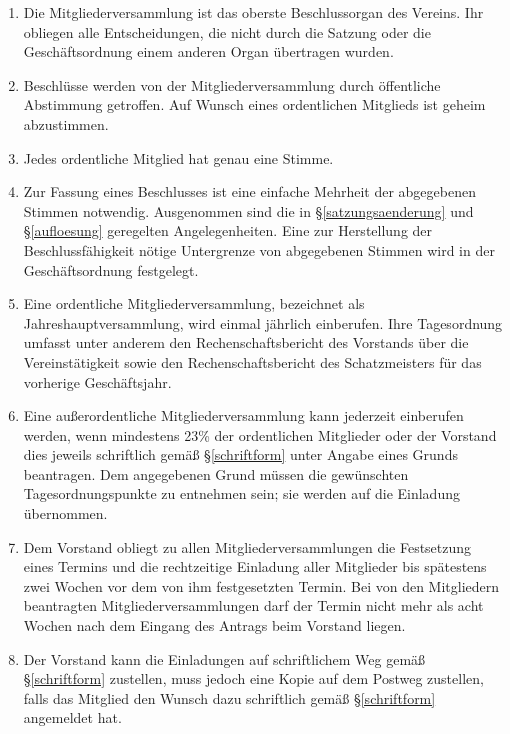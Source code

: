 \documentclass[fontsize=12pt,paper=a4,pagesize,headings=small]{scrartcl}
\begin{document}
\begin{enumerate}
	\item Die Mitgliederversammlung ist das oberste Beschlussorgan des
		Vereins. Ihr obliegen alle Entscheidungen, die nicht durch die
		Satzung oder die Geschäftsordnung einem anderen Organ übertragen
		wurden.

	\item Beschlüsse werden von der Mitgliederversammlung durch öffentliche
		Abstimmung getroffen. Auf Wunsch eines ordentlichen Mitglieds ist geheim
		abzustimmen.

	\item Jedes ordentliche Mitglied hat genau eine Stimme.

	\item Zur Fassung eines Beschlusses ist eine einfache Mehrheit der
		abgegebenen Stimmen notwendig. Ausgenommen sind die in
		§\ref{satzungsaenderung} und §\ref{aufloesung} geregelten
		Angelegenheiten. Eine zur Herstellung der
		Beschlussfähigkeit nötige Untergrenze von abgegebenen
		Stimmen wird in der Geschäftsordnung festgelegt.

	\item Eine ordentliche Mitgliederversammlung, bezeichnet als
		Jahreshauptversammlung, wird einmal jährlich einberufen. Ihre
		Tagesordnung umfasst unter anderem den Rechenschaftsbericht des
		Vorstands über die Vereinstätigkeit sowie den Rechenschaftsbericht des
		Schatzmeisters für das vorherige Geschäftsjahr.

	\item Eine außerordentliche Mitgliederversammlung kann jederzeit
		einberufen werden, wenn mindestens 23\% der ordentlichen Mitglieder
		oder der Vorstand dies jeweils schriftlich gemäß §\ref{schriftform} unter Angabe
		eines Grunds beantragen. Dem angegebenen Grund müssen die gewünschten
		Tagesordnungspunkte zu entnehmen sein; sie werden auf die Einladung
		übernommen.

	\item Dem Vorstand obliegt zu allen Mitgliederversammlungen die
		Festsetzung eines Termins und die rechtzeitige Einladung aller
		Mitglieder bis spätestens zwei Wochen vor dem von ihm festgesetzten
		Termin. Bei von den Mitgliedern beantragten Mitgliederversammlungen
		darf der Termin nicht mehr als acht Wochen nach dem Eingang des Antrags
		beim Vorstand liegen.

	\item Der Vorstand kann die Einladungen auf schriftlichem Weg gemäß §\ref{schriftform}
		zustellen, muss jedoch eine Kopie auf dem Postweg zustellen, falls
		das Mitglied den Wunsch dazu schriftlich gemäß §\ref{schriftform} angemeldet hat.


\end{enumerate}
\end{document}

